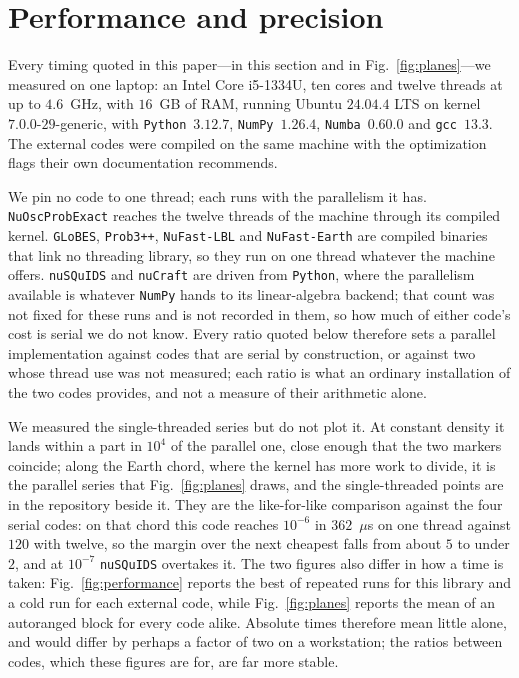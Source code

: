 \documentclass[final,5p,times,twocolumn,sort,compress]{elsarticle}
\newcommand{\fig}{Fig.}
\newcommand{\figu}[1]{\fig~\ref{fig:#1}}
\begin{document}

\section{Performance and precision}
\label{sec:performance}

Every timing quoted in this paper---in this section and in \figu{planes}---we measured on one laptop: an Intel Core i5-1334U, ten cores and twelve threads at up to $4.6$~GHz, with $16$~GB of RAM, running Ubuntu $24.04.4$ LTS on kernel $7.0.0$-$29$-generic, with {\tt Python}~$3.12.7$, {\tt NumPy}~$1.26.4$, {\tt Numba}~$0.60.0$ and {\tt gcc}~$13.3$.  The external codes were compiled on the same machine with the optimization flags their own documentation recommends.

We pin no code to one thread; each runs with the parallelism it has.  {\tt NuOscProbExact} reaches the twelve threads of the machine through its compiled kernel.  {\tt GLoBES}, {\tt Prob3++}, {\tt NuFast-LBL} and {\tt NuFast-Earth} are compiled binaries that link no threading library, so they run on one thread whatever the machine offers.  {\tt nuSQuIDS} and {\tt nuCraft} are driven from {\tt Python}, where the parallelism available is whatever {\tt NumPy} hands to its linear-algebra backend; that count was not fixed for these runs and is not recorded in them, so how much of either code's cost is serial we do not know.  Every ratio quoted below therefore sets a parallel implementation against codes that are serial by construction, or against two whose thread use was not measured; each ratio is what an ordinary installation of the two codes provides, and not a measure of their arithmetic alone.

We measured the single-threaded series but do not plot it.  At constant density it lands within a part in $10^4$ of the parallel one, close enough that the two markers coincide; along the Earth chord, where the kernel has more work to divide, it is the parallel series that \figu{planes} draws, and the single-threaded points are in the repository beside it.  They are the like-for-like comparison against the four serial codes: on that chord this code reaches $10^{-6}$ in $362$~$\mu$s on one thread against $120$ with twelve, so the margin over the next cheapest falls from about $5$ to under $2$, and at $10^{-7}$ {\tt nuSQuIDS} overtakes it.  The two figures also differ in how a time is taken: \figu{performance} reports the best of repeated runs for this library and a cold run for each external code, while \figu{planes} reports the mean of an autoranged block for every code alike.  Absolute times therefore mean little alone, and would differ by perhaps a factor of two on a workstation; the ratios between codes, which these figures are for, are far more stable.
\end{document}
